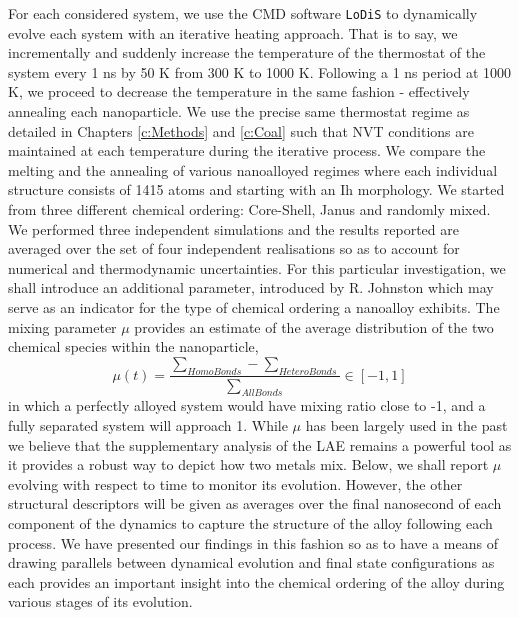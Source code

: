 For each considered system, we use the CMD software \texttt{LoDiS} \cite{LoDiS} to dynamically evolve each system with an iterative heating approach. That is to say, we incrementally and suddenly increase the temperature of the thermostat of the system every 1 ns by 50 K from 300 K to 1000 K. Following a 1 ns period at 1000 K, we proceed to decrease the temperature in the same fashion - effectively annealing each nanoparticle. We use the precise same thermostat regime as detailed in Chapters \ref{c:Methods} and \ref{c:Coal} such that NVT conditions are maintained at each temperature during the iterative process. We compare the melting and the annealing of various nanoalloyed regimes where each individual structure consists of 1415 atoms and starting with an Ih morphology. We started from three different chemical ordering: Core-Shell, Janus and randomly mixed. We performed three independent simulations and the results reported are averaged over the set of four independent realisations so as to account for numerical and thermodynamic uncertainties. 
For this particular investigation, we shall introduce an additional parameter, introduced by R. Johnston \cite{B204069G} which may serve as an indicator for the type of chemical ordering a nanoalloy exhibits. The mixing parameter $\mu$ provides an estimate of the average distribution of the two chemical species within the nanoparticle,
\begin{equation}
\mu\left( t \right) = \frac{ \sum_{Homo Bonds} - \sum_{Hetero Bonds} }{ \sum_{All Bonds} } \in [-1, 1 ] 
\label{eqn:mu}
\end{equation}
in which a perfectly alloyed system would have mixing ratio close to -1, and a fully  separated system will approach 1. While $\mu$ has been largely used in the past \cite{B204069G} we believe that the supplementary analysis of the LAE remains a powerful tool as it provides a robust way to depict how two metals mix. Below, we shall report $\mu$ evolving with respect to time to monitor its evolution. However, the other structural descriptors will be given as averages over the final nanosecond of each component of the dynamics to capture the structure of the alloy following each process. We have presented our findings in this fashion so as to have a means of drawing parallels between dynamical evolution and final state configurations as each provides an important insight into the chemical ordering of the alloy during various stages of its evolution.


